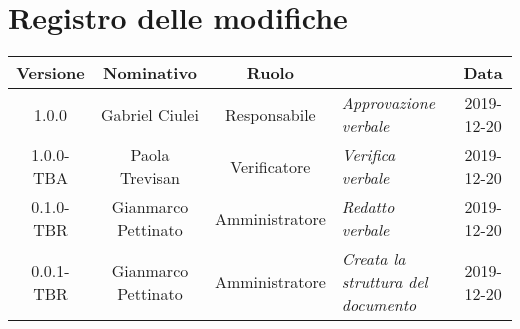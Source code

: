 \section*{Registro delle modifiche}
\renewcommand{\arraystretch}{1.8}

  \begin{longtable}{|c|c|c|p{3.8cm}|c|}
    \hline

    \rowcolor{header}
    \textbf{Versione} & \textbf{Nominativo} & \textbf{Ruolo} & \centering{\textbf{Descrizione}} & \textbf{Data}\\

    \hline
    1.0.0 & Gabriel Ciulei & Responsabile & \small{\textit{Approvazione verbale}} & 2019-12-20\\
	1.0.0-TBA & Paola Trevisan & Verificatore & \small{\textit{Verifica verbale}} & 2019-12-20\\
	0.1.0-TBR & Gianmarco Pettinato & Amministratore & \small{\textit{Redatto verbale}} & 2019-12-20\\
    0.0.1-TBR & Gianmarco Pettinato & Amministratore & \small{\textit{Creata la struttura del documento}} & 2019-12-20\\

    \hline
  \end{longtable}

